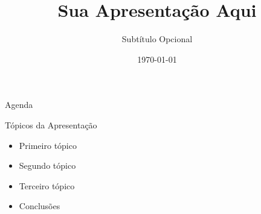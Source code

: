 \documentclass[aspectratio=169]{beamer}
\title{Sua Apresentação Aqui}
\subtitle{Subtítulo Opcional}
\date{\today}
\begin{document}


\titlepagepadrao
\begin{frame}[plain]
    \maketitle
\end{frame}



\layoutpadrao

\begin{frame}{Agenda}
    \begin{block}{Tópicos da Apresentação}
        \begin{itemize}
            \item Primeiro tópico
            \item Segundo tópico
            \item Terceiro tópico
            \item Conclusões
        \end{itemize}
    \end{block}
\end{frame}
\end{document}
